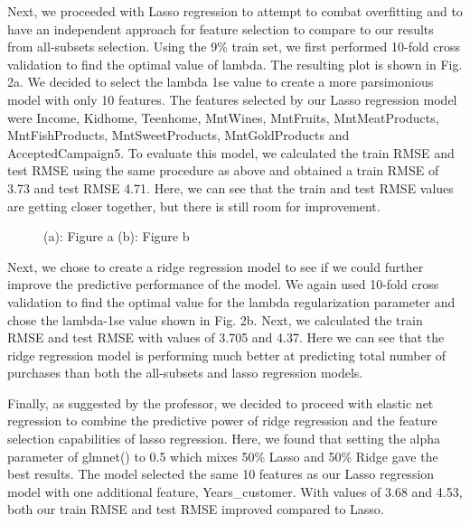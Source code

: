 \documentclass[11pt]{article} %
\begin{document}
\quad Next, we proceeded with Lasso regression to attempt to combat overfitting and to have an independent approach for feature selection to compare to our results from all-subsets selection. Using the 9\% train set, we first performed 10-fold cross validation to find the optimal value of lambda. The resulting plot is shown in Fig. 2a. We decided to select the lambda 1se value to create a more parsimonious model with only 10 features. The features selected by our Lasso regression model were Income, Kidhome, Teenhome, MntWines, MntFruits, MntMeatProducts, MntFishProducts, MntSweetProducts, MntGoldProducts and AcceptedCampaign5. To evaluate this model, we calculated the train RMSE and test RMSE using the same procedure as above and obtained a train RMSE of 3.73 and test RMSE 4.71. Here, we can see that the train and test RMSE values are getting closer together, but there is still room for improvement.
\begin{figure}[H]
    \centering
    \caption{(a): Figure a (b): Figure b}
    \label{fig:foobar}
\end{figure}
\quad Next, we chose to create a ridge regression model to see if we could further improve the predictive performance of the model. We again used 10-fold cross validation to find the optimal value for the lambda regularization parameter and chose the lambda-1se value shown in Fig. 2b. Next, we calculated the train RMSE and test RMSE with values of 3.705 and 4.37. Here we can see that the ridge regression model is performing much better at predicting total number of purchases than both the all-subsets and lasso regression models.

\quad Finally, as suggested by the professor, we decided to proceed with elastic net regression to combine the predictive power of ridge regression and the feature selection capabilities of lasso regression. Here, we found that setting the alpha parameter of glmnet() to 0.5 which mixes 50\% Lasso and 50\% Ridge gave the best results. The model selected the same 10 features as our Lasso regression model with one additional feature, Years\_customer. With values of 3.68 and 4.53, both our train RMSE and test RMSE improved compared to Lasso. 
\end{document}
